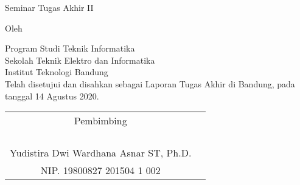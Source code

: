 \clearpage
\pagestyle{empty}

\begin{center}
    \smallskip

    \Large \bfseries \MakeUppercase{\thetitle}
    \vfill

    \Large Seminar Tugas Akhir II
    \vfill

    \large Oleh

    \Large \theauthor

    \large Program Studi Teknik Informatika \\
    Sekolah Teknik Elektro dan Informatika \\
    Institut Teknologi Bandung \\

    \vfill
    \normalsize \normalfont
    Telah disetujui dan disahkan sebagai Laporan Tugas Akhir di Bandung, pada tanggal 14 Agustus 2020.

    \vfill
    \setlength{\tabcolsep}{12pt}
    \begin{tabular}{c@{\hskip 0in}c}
        Pembimbing                             \\
         &                                     \\
         &                                     \\
         &                                     \\
         &                                     \\
        Yudistira Dwi Wardhana Asnar ST, Ph.D. \\
        NIP. 19800827 201504 1 002             \\
    \end{tabular}

\end{center}
\clearpage
